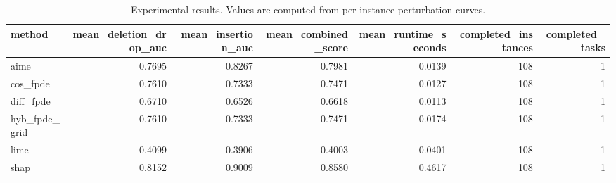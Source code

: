 \begin{table}[t]
\caption{Experimental results. Values are computed from per-instance perturbation curves.}
\label{tab:main_results_computed}
\centering
\begin{tabular}{lrrrrrr}
\toprule
method & mean\_deletion\_drop\_auc & mean\_insertion\_auc & mean\_combined\_score & mean\_runtime\_seconds & completed\_instances & completed\_tasks \\
\midrule
aime & 0.7695 & 0.8267 & 0.7981 & 0.0139 & 108 & 1 \\
cos\_fpde & 0.7610 & 0.7333 & 0.7471 & 0.0127 & 108 & 1 \\
diff\_fpde & 0.6710 & 0.6526 & 0.6618 & 0.0113 & 108 & 1 \\
hyb\_fpde\_grid & 0.7610 & 0.7333 & 0.7471 & 0.0174 & 108 & 1 \\
lime & 0.4099 & 0.3906 & 0.4003 & 0.0401 & 108 & 1 \\
shap & 0.8152 & 0.9009 & 0.8580 & 0.4617 & 108 & 1 \\
\bottomrule
\end{tabular}

\end{table}

